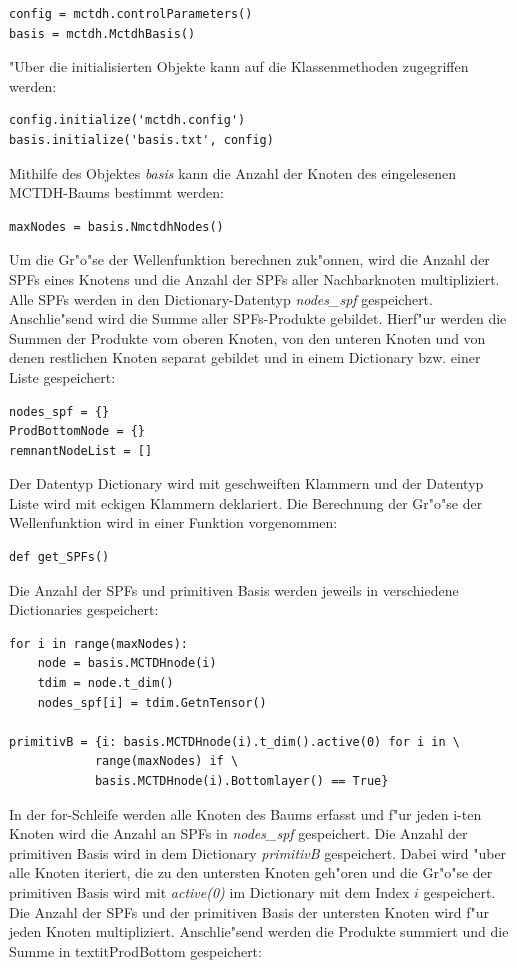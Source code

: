 \begin{verbatim}
config = mctdh.controlParameters()
basis = mctdh.MctdhBasis()
\end{verbatim}

"Uber die initialisierten Objekte kann auf die Klassenmethoden zugegriffen werden: 
\begin{verbatim}
config.initialize('mctdh.config')
basis.initialize('basis.txt', config)
\end{verbatim}

Mithilfe des Objektes \textit{basis} kann die Anzahl der Knoten des eingelesenen MCTDH-Baums bestimmt werden:
\begin{verbatim}
maxNodes = basis.NmctdhNodes()
\end{verbatim}

Um die Gr"o"se der Wellenfunktion berechnen zuk"onnen, wird die Anzahl der SPFs eines Knotens
und die Anzahl der SPFs aller Nachbarknoten multipliziert.
Alle SPFs werden in den Dictionary-Datentyp \textit{nodes\_spf} gespeichert. 
Anschlie"send wird die Summe aller SPFs-Produkte gebildet.
Hierf"ur werden die Summen der Produkte vom oberen Knoten, von den unteren Knoten und von denen
restlichen Knoten separat gebildet und in einem Dictionary bzw. einer Liste gespeichert:

\begin{verbatim}
nodes_spf = {}
ProdBottomNode = {}
remnantNodeList = []
\end{verbatim}

Der Datentyp Dictionary wird mit geschweiften Klammern und der 
Datentyp Liste wird mit eckigen Klammern deklariert.
Die Berechnung der Gr"o"se der Wellenfunktion wird in einer Funktion vorgenommen:

\begin{verbatim}
def get_SPFs()
\end{verbatim}

Die Anzahl der SPFs und primitiven Basis werden jeweils in verschiedene Dictionaries gespei\-chert:

\begin{verbatim}
for i in range(maxNodes):
    node = basis.MCTDHnode(i)
    tdim = node.t_dim()
    nodes_spf[i] = tdim.GetnTensor() 

primitivB = {i: basis.MCTDHnode(i).t_dim().active(0) for i in \
            range(maxNodes) if \
            basis.MCTDHnode(i).Bottomlayer() == True}
\end{verbatim}

In der for-Schleife werden alle Knoten des Baums erfasst und f"ur jeden i-ten Knoten 
wird die Anzahl an SPFs in \textit{nodes\_spf} gespeichert.
Die Anzahl der primitiven Basis wird in dem Dictionary \textit{primitivB} gespeichert.
Dabei wird "uber alle Knoten iteriert, die zu den untersten Knoten geh"oren und
die Gr"o"se der primitiven Basis wird mit \textit{active(0)} im Dictionary mit dem Index
$i$ gespeichert.
Die Anzahl der SPFs und der primitiven Basis der untersten Knoten wird f"ur jeden Knoten
multipliziert.
Anschlie"send werden die Produkte summiert und die Summe in textit{ProdBottom} gespeichert:

